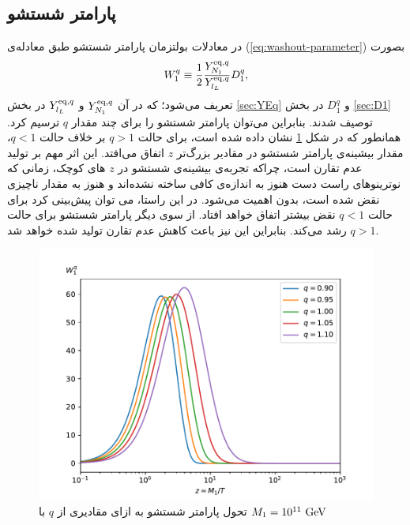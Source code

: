\documentclass[a4paper]{book}
\begin{document}
\subsection{پارامتر شستشو}
\label{sec:W1}
در معادلات بولتزمان پارامتر شستشو طبق معادله‌ی (\ref{eq:washout-parameter}) بصورت
{\footnotesize\begin{align}
	W^q_1 \equiv \frac{1}{2} \frac{Y_{N_1}^{{\rm eq},q}}{Y_{{l_L}}^{{\rm eq},q}} D^q_1,
	\label{eq:W1}
\end{align}}
تعریف می‌شود؛ که در آن {\footnotesize$Y^{{\rm eq},q}_{N_1}$} و {\footnotesize$Y^{{\rm eq},q}_{l_L}$} در بخش \ref{sec:YEq} و {\footnotesize$D_1^q$} در بخش \ref{sec:D1} توصیف شدند.
بنابراین می‌توان پارامتر شستشو را برای چند مقدار {\footnotesize$q$} ترسیم کرد. همانطور که در شکل \ref{fig:W1-nonextensive} نشان داده شده است، برای حالت {\footnotesize$q>1$} بر خلاف حالت {\footnotesize$q<1$}، مقدار بیشینه‌ی پارامتر شستشو در مقادیر بزرگ‌تر {\footnotesize$z$} اتفاق می‌افتد. این اثر مهم بر تولید عدم تقارن است، چراکه تجربه‌ی بیشینه‌ی شستشو در {\footnotesize$z$} های کوچک، زمانی که نوترینوهای راست دست هنوز به اندازه‌ی کافی ساخته نشده‌اند و هنوز  به مقدار ناچیزی نقض شده است، بدون اهمیت می‌شود. در این راستا، می توان پیش‌بینی کرد برای حالت {\footnotesize$q<1$} نقض  بیشتر اتفاق خواهد افتاد. از سوی دیگر پارامتر شستشو برای حالت {\footnotesize$q>1$} رشد می‌کند. بنابراین این نیز باعث کاهش عدم تقارن تولید شده خواهد شد.
\begin{figure}[!h]
	\centering
	\includegraphics[width=13cm]{fig-W1-nonextensive.pdf}
	\caption{تحول پارامتر شستشو به ازای مقادیری از {\footnotesize$q$} با {\footnotesize$M_1 = 10^{11}\ \rm GeV$} \label{fig:W1-nonextensive}}
\end{figure}
\end{document}
